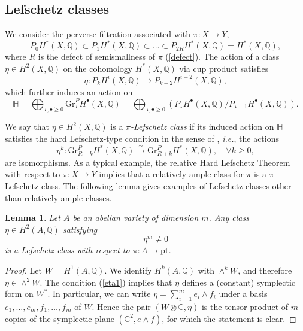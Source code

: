 \documentclass[11pt]{amsart}
\theoremstyle{plain}
\newtheorem{lem}[thm]{Lemma}
\theoremstyle{definition}
\theoremstyle{remark}
\newcommand{\BC}{{\mathbb{C}}}
\newcommand{\BH}{{\mathbb{H}}}
\newcommand{\BQ}{{\mathbb{Q}}}
\begin{document}
\subsection{Lefschetz classes}\label{Lefschetz classes}
We consider the perverse filtration associated with $\pi: X \to Y$,
\begin{equation}\label{e50}
P_0H^\ast(X, \BQ) \subset P_1H^\ast(X, \BQ) \subset \dots \subset P_{2{R}}H^\ast(X, \BQ) =  H^\ast(X, \BQ),
\end{equation}
where ${R}$ is the defect of semismallness  of $\pi$ (\ref{defect}). The action of a class $\eta \in H^2(X, \BQ)$ on the cohomology $H^*(X, \BQ)$ via cup product satisfies
\begin{equation}\label{e51}
\eta: P_kH^i(X, \BQ) \to P_{k+2}H^{i+2}(X, \BQ),
\end{equation}
which further induces an action on 
\[
\BH = \bigoplus_{\star,\bullet\geq 0} \mathrm{Gr}_\star^P H^{\bullet}(X, \BQ)= \bigoplus_{\star,\bullet \geq 0} \left( P_\star H^{\bullet}(X, \BQ)/P_{\star-1}H^{\bullet}(X, \BQ) \right).
\]


 We say that  $\eta \in H^2(X, \BQ)$  is a \emph{$\pi$-Lefschetz class}  if its induced action on $\BH$ satisfies the hard Lefschetz-type condition in the sense of \cite[Assumption 2.3.1]{dC}, \emph{i.e.}, the actions
\begin{equation}\label{pi-lefschetz}
\eta^k: \mathrm{Gr}^P_{{R} -k}H^*(X, \BQ) \xrightarrow{\simeq}  \mathrm{Gr}^P_{{R}+k}H^*(X, \BQ), \quad \forall k\geq 0,
\end{equation}
are isomorphisms. As a typical example, the relative Hard Lefschetz Theorem \cite{BBD} with respect to $\pi: X \to Y$ implies that a relatively ample class for $\pi$  is a $\pi$-Lefschetz class. The following lemma gives examples of Lefschetz classes other than relatively ample classes.  

\begin{lem}\label{Lemma3.1}
Let $A$ be an abelian variety of dimension $m$. Any class $\eta \in H^2(A, \BQ)$ satisfying
\begin{equation}\label{eta1}
\eta^m \neq 0 
\end{equation}
is a Lefschetz class with respect to $\pi: A \to \mathrm{pt}$.
\end{lem}

\begin{proof} 
Let $W = H^1(A, \BQ)$. We identify $H^k(A, \BQ)$ with $\wedge^k W$, and therefore $\eta \in \wedge^2W$. The condition (\ref{eta1}) implies that $\eta$ defines a (constant) symplectic form on $W^*$. In particular, we can write $\eta = \sum_{i=1}^m e_i \wedge f_i$ under a basis $e_1,\dots, e_m, f_1, \dots, f_m$ of $W$. Hence the pair $(W\otimes \BC, \eta)$ is the tensor product of $m$ copies of the symplectic plane $(\BC^2, e \wedge f)$, for which the statement is clear.
\end{proof}
\end{document}
